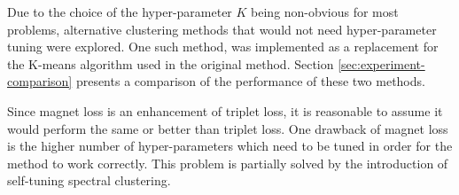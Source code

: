 Due to the choice of the hyper-parameter \( K \) being non-obvious for most problems, alternative clustering methods that would not need hyper-parameter tuning were explored. One such method,  \cite{zelnik-manor_self-tuning_2005} was implemented as a replacement for the K-means algorithm used in the original method. Section \ref{sec:experiment-comparison} presents a comparison of the performance of these two methods.

Since magnet loss is an enhancement of triplet loss, it is reasonable to assume it would perform the same or better than triplet loss. One drawback of magnet loss is the higher number of hyper-parameters which need to be tuned in order for the method to work correctly. This problem is partially solved by the introduction of self-tuning spectral clustering.
